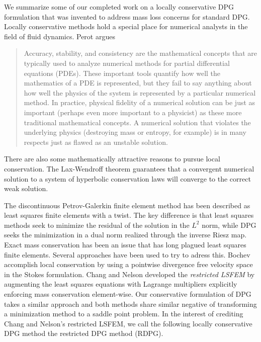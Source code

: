 \documentclass[Proposal.tex]{subfiles}
\begin{document}
We summarize some of our completed work on a locally conservative DPG formulation that was invented to address mass loss concerns for standard DPG.
Locally conservative methods hold a special place for numerical analysts in
the field of fluid dynamics.
Perot\cite{Perot2011} argues
\begin{quote}
Accuracy, stability, and consistency are the mathematical concepts that are
typically used to analyze numerical methods for partial differential equations
(PDEs). These important tools quantify how well the mathematics of a PDE is
represented, but they fail to say anything about how well the physics of the
system is represented by a particular numerical method. In practice, physical
fidelity of a numerical solution can be just as important (perhaps even more
important to a physicist) as these more traditional mathematical concepts. A
numerical solution that violates the underlying physics (destroying mass or
entropy, for example) is in many respects just as flawed as an unstable
solution.
\end{quote}
There are also some mathematically attractive reasons to pursue local
conservation. The Lax-Wendroff theorem guarantees that a convergent numerical
solution to a system of hyperbolic conservation laws will converge to the
correct weak solution.

The discontinuous Petrov-Galerkin finite element method has been described as
least squares finite elements with a twist. The key difference is that least
squares methods seek to minimize the residual of the solution in the $L^2$
norm, while DPG seeks the minimization in a dual norm realized through the
inverse Riesz map. Exact mass conservation has been an issue that has long plagued
least squares finite elements. Several approaches have been
used to try to adress this. Bochev \etal\cite{Bochev2010} accomplish local
conservation by using a pointwise divergence free velocity space in the Stokes
formulation.  Chang and Nelson\cite{ChangNelson1997} developed the
\emph{restricted LSFEM}\cite{ChangNelson1997} by augmenting the least squares
equations with Lagrange multipliers explicitly enforcing mass conservation
element-wise. Our conservative formulation of DPG takes a similar approach and
both methods share similar negative of transforming a minimization method to a
saddle point problem. In the interest of crediting Chang and Nelson's
restricted LSFEM, we call the following locally conservative DPG method the
restricted DPG method (RDPG).
\end{document}
